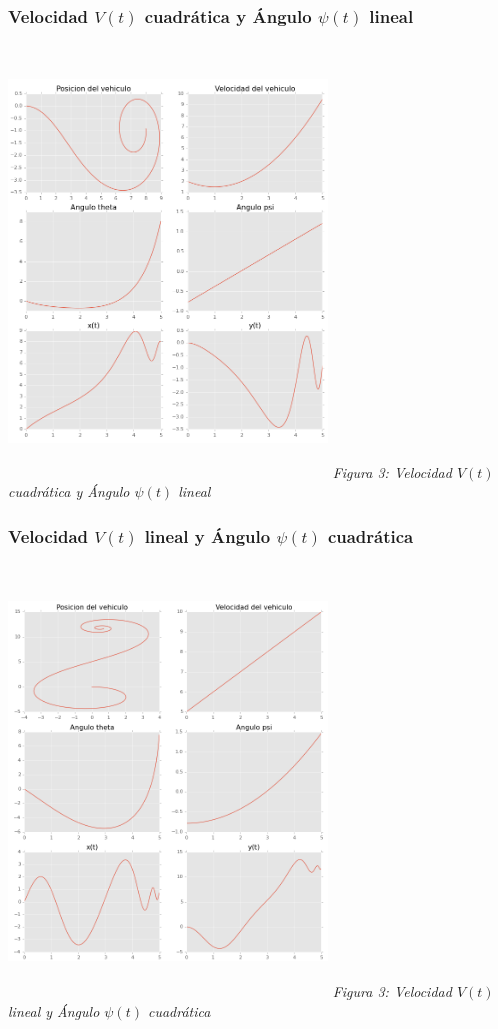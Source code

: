 \documentclass[twoside]{article}
\begin{document}
\begin{multicols}{2}
\subsubsection{Velocidad $V(t)$ cuadrática y Ángulo $\psi(t)$ lineal}
\begin{center}
 \includegraphics[width=240pt,height=325pt]{./v_quad_psi_lin.png}
  \textit{Figura 3: Velocidad $V(t)$ cuadrática y Ángulo $\psi(t)$ lineal}
\end{center}

\subsubsection{Velocidad $V(t)$ lineal y Ángulo $\psi(t)$ cuadrática}
\begin{center}
 \includegraphics[width=240pt,height=325pt]{./v_lin_psi_quad.png}
  \textit{Figura 3: Velocidad $V(t)$ lineal y Ángulo $\psi(t)$ cuadrática}
\end{center}


\end{multicols}
\end{document}

